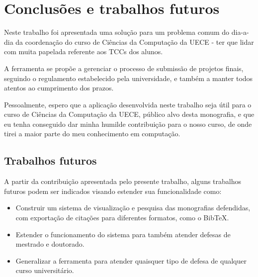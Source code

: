 \chapter{Conclusões e trabalhos futuros}
\label{cha:conclusoes}

Neste trabalho foi apresentada uma solução para um problema comum do dia-a-dia
da coordenação do curso de Ciências da Computação da UECE - ter que lidar com
muita papelada referente aos TCCs dos alunos.

A ferramenta se propõe a gerenciar o processo de submissão de projetos finais, seguindo
o regulamento estabelecido pela universidade, e também a manter todos atentos ao cumprimento
dos prazos.

Pessoalmente, espero que a aplicação desenvolvida neste trabalho seja útil
para o curso de Ciências da Computação da UECE, público alvo desta monografia, 
e que eu tenha conseguido dar minha humilde contribuição para o nosso curso,
de onde tirei a maior parte do meu conhecimento em computação.

\section{Trabalhos futuros}
A partir da contribuição apresentada pelo presente trabalho, alguns
trabalhos futuros podem ser indicados visando estender sua funcionalidade como:

\begin{itemize}
\item Construir um sistema de visualização e pesquisa das monografias defendidas, 
com exporta\-ção de citações para diferentes formatos, como o {\sc Bib}\TeX.
\item Estender o funcionamento do sistema para também atender defesas de mestrado e doutorado.
\item Generalizar a ferramenta para atender quaisquer tipo de defesa de qualquer curso universitário.
\end{itemize}
